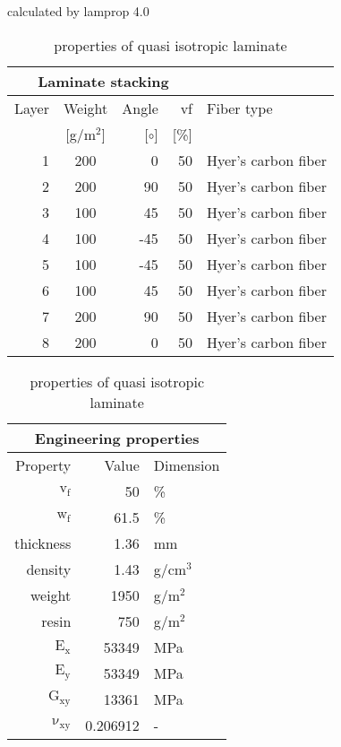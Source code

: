 \begin{table}[!htbp]
  \renewcommand{\arraystretch}{1.2}
  \caption{\label{tab:quasi isotropic laminate}properties of quasi isotropic laminate}
  \centering\footnotesize{\rule{0pt}{10pt}
  \tiny calculated by lamprop 4.0\\[3pt]}
    \begin{tabular}[t]{rcrrl}
      \multicolumn{4}{c}{\small\textbf{Laminate stacking}}\\[0.1em]
      \toprule %
      Layer & Weight & Angle & vf & Fiber type\\
            & [g/m$^2$] & [$\circ$] & [\%]\\
      \midrule
      1 &  200 &     0 & 50 & Hyer's carbon fiber\\
      2 &  200 &    90 & 50 & Hyer's carbon fiber\\
      3 &  100 &    45 & 50 & Hyer's carbon fiber\\
      4 &  100 &   -45 & 50 & Hyer's carbon fiber\\
      5 &  100 &   -45 & 50 & Hyer's carbon fiber\\
      6 &  100 &    45 & 50 & Hyer's carbon fiber\\
      7 &  200 &    90 & 50 & Hyer's carbon fiber\\
      8 &  200 &     0 & 50 & Hyer's carbon fiber\\
      \bottomrule
    \end{tabular}\hspace{0.02\textwidth}
    \begin{tabular}[t]{rrl}
      \multicolumn{3}{c}{\small\textbf{Engineering properties}}\\[0.1em]
      \toprule
      Property & Value & Dimension\\
      \midrule
      $\mathrm{v_f}$ & 50 &\%\\
      $\mathrm{w_f}$ & 61.5 &\%\\
      thickness & 1.36 & mm\\
      density & 1.43 & g/cm$^3$\\
      weight & 1950 & g/m$^2$\\
      resin & 750 & g/m$^2$\\
      \midrule
      $\mathrm{E_x}$ &    53349 & MPa\\
      $\mathrm{E_y}$ &    53349 & MPa\\
      $\mathrm{G_{xy}}$ &    13361 & MPa\\
      $\mathrm{\nu_{xy}}$ & 0.206912 &-\\

\end{tabular}
\end{table}
